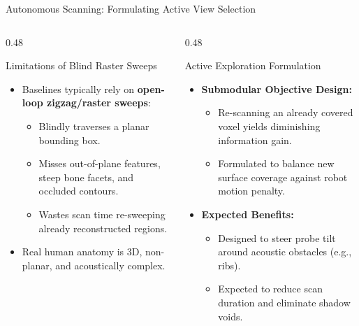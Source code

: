 \documentclass[aspectratio=169, 10pt]{beamer}
\begin{document}
\begin{frame}{Autonomous Scanning: Formulating Active View Selection}
    \begin{columns}[T]
        \begin{column}{0.48\textwidth}
            \begin{alertblock}{Limitations of Blind Raster Sweeps}
                \begin{itemize}
                    \item Baselines typically rely on \textbf{open-loop zigzag/raster sweeps}:
                    \begin{itemize}
                        \item Blindly traverses a planar bounding box.
                        \item Misses out-of-plane features, steep bone facets, and occluded contours.
                        \item Wastes scan time re-sweeping already reconstructed regions.
                    \end{itemize}
                    \item Real human anatomy is 3D, non-planar, and acoustically complex.
                \end{itemize}
            \end{alertblock}
        \end{column}
        \begin{column}{0.48\textwidth}
            \begin{block}{Active Exploration Formulation}
                \begin{itemize}
                    \item \textbf{Submodular Objective Design:}
                    \begin{itemize}
                        \item Re-scanning an already covered voxel yields diminishing information gain.
                        \item Formulated to balance new surface coverage against robot motion penalty.
                    \end{itemize}
                    \item \textbf{Expected Benefits:}
                    \begin{itemize}
                        \item Designed to steer probe tilt around acoustic obstacles (e.g., ribs).
                        \item Expected to reduce scan duration and eliminate shadow voids.

\end{itemize}
\end{itemize}
\end{block}
\end{column}
\end{columns}
\end{frame}
\end{document}
